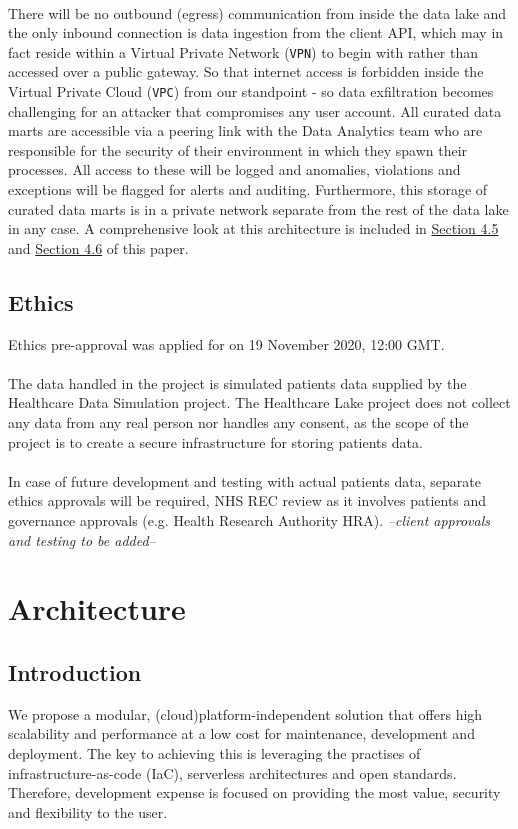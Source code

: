 \documentclass[10pt]{article}
\begin{document}
\paragraph{}
There will be no outbound (egress) communication from inside the data lake and the only inbound connection is data ingestion from the client API, which may in fact reside within a Virtual Private Network (\texttt{VPN}) to begin with rather than accessed over a public gateway. So that internet access is forbidden inside the Virtual Private Cloud (\texttt{VPC}) from our standpoint - so data exfiltration becomes challenging for an attacker that compromises any user account. All curated data marts are accessible via a peering link with the Data Analytics team who are responsible for the security of their environment in which they spawn their processes. All access to these will be logged and anomalies, violations and exceptions will be flagged for alerts and auditing. Furthermore, this  storage of curated data marts is in a private network separate from the rest of the data lake in any case. A comprehensive look at this architecture is included in \hyperref[sec:secure_access]{Section 4.5} and \hyperref[sec:network]{Section 4.6} of this paper. 

\subsection{Ethics}
Ethics pre-approval was applied for on 19 November 2020, 12:00 GMT. 
\\
\\
The data handled in the project is simulated patients data supplied by the Healthcare Data Simulation project. The Healthcare Lake project does not collect any data from any real person nor handles any consent, as the scope of the project is to create a secure infrastructure for storing patients data. \\ \\
In case of future development and testing with actual patients data, separate ethics approvals will be required, NHS REC review as it involves patients and governance approvals (e.g. Health Research Authority HRA). \emph{--client approvals and testing to be added--}

\newpage
\section{Architecture}
\subsection{Introduction}
\label{arch:intro}
We propose a modular, (cloud)platform-independent solution that offers high scalability and performance at a low cost for maintenance, development and deployment. The key to achieving this is leveraging the practises of infrastructure-as-code (IaC), serverless architectures and open standards. Therefore, development expense is focused on providing the most value, security and flexibility to the user.\\
\end{document}
